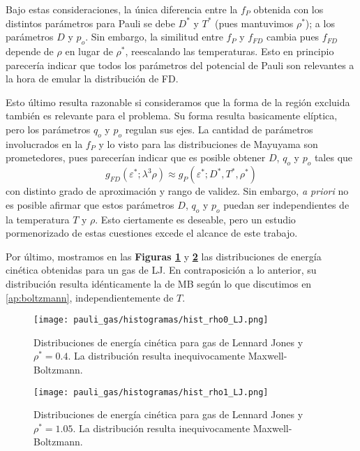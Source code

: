 Bajo estas consideraciones, la única diferencia entre la $f_P$ obtenida con los distintos parámetros para Pauli se debe $D^*$ y $T^*$ (pues mantuvimos $\rho^*$); a los parámetros $D$ y $p_o$.
Sin embargo, la similitud entre $f_P$ y $f_{FD}$ cambia pues $f_{FD}$ depende de $\rho$ en lugar de $\rho^*$, reescalando las temperaturas.
Esto en principio parecería indicar que todos los parámetros del potencial de Pauli son relevantes a la hora de emular la distribución de FD.

Esto último resulta razonable si consideramos que la forma de la región excluida también es relevante para el problema.
Su forma resulta basicamente elíptica, pero los parámetros $q_o$ y $p_o$ regulan sus ejes.
La cantidad de parámetros involucrados en la $f_P$ y lo visto para las distribuciones de Mayuyama son prometedores, pues parecerían indicar que es posible obtener $D$, $q_o$ y $p_o$ tales que
\[ g_{FD}(\varepsilon^*;\lambda^3\rho) \approx g_P(\varepsilon^*; D^*, T^*, \rho^*) \]
con distinto grado de aproximación y rango de validez.
Sin embargo, \textit{a priori} no es posible afirmar que estos parámetros $D$, $q_o$ y $p_o$ puedan ser independientes de la temperatura $T$ y $\rho$.
Esto ciertamente es deseable, pero un estudio pormenorizado de estas cuestiones excede el alcance de este trabajo.


Por último, mostramos en las \textbf{Figuras \ref{fig:hist_rho0_LJ}} y \textbf{\ref{fig:hist_rho1_LJ}} las distribuciones de energía cinética obtenidas para un gas de LJ.
En contraposición a lo anterior, su distribución resulta idénticamente la de MB según lo que discutimos en \ref{ap:boltzmann}, independientemente de $T$.

\begin{figure}[H]
	\centering
	\texttt{[image: pauli\_gas/histogramas/hist\_rho0\_LJ.png]}
	\caption{Distribuciones de energía cinética para gas de Lennard Jones y $\rho^* = 0.4$.
	La distribución resulta inequivocamente Maxwell-Boltzmann.}
	\label{fig:hist_rho0_LJ}
\end{figure}
\begin{figure}[H]
	\centering
	\texttt{[image: pauli\_gas/histogramas/hist\_rho1\_LJ.png]}
	\caption{Distribuciones de energía cinética para gas de Lennard Jones y $\rho^* = 1.05$.
	La distribución resulta inequivocamente Maxwell-Boltzmann.}
	\label{fig:hist_rho1_LJ}
\end{figure}


